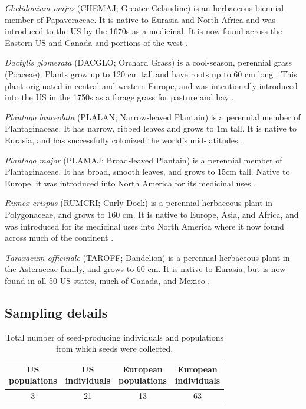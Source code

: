 \documentclass[12pt]{article}\usepackage[]{graphicx}\usepackage[]{color}
\begin{document}
	\textit{Chelidonium majus} (CHEMAJ; Greater Celandine) is an herbaceous biennial member of Papaveraceae. It is native to Eurasia and North Africa and was introduced to the US by the 1670s as a medicinal. It is now found across the Eastern US and Canada and portions of the west \parencite{Holm1979}. 
	
	\textit{Dactylis glomerata} (DACGLO; Orchard Grass) is a cool-season, perennial grass (Poaceae). Plants grow up to 120 cm tall and have roots up to 60 cm long \parencite{Moser1996}. This plant originated in central and western Europe, and was intentionally introduced into the US in the 1750s \parencite{Bush2012} as a forage grass for pasture and hay \parencite{Ogle2011}.  
	
	\textit{Plantago lanceolata} (PLALAN; Narrow-leaved Plantain) is a perennial member of  Plantaginaceae. It has narrow, ribbed leaves and grows to 1m tall. It is native to Eurasia, and has successfully colonized the world's mid-latitudes \parencite{Holm1977}.
	
	\textit{Plantago major} (PLAMAJ; Broad-leaved Plantain) is a perennial member of Plantaginaceae. It has broad, smooth leaves, and grows to 15cm tall. Native to Europe, it was introduced into North America for its medicinal uses \parencite{Knobloch1996,Samuelsen2000}.
	
	\textit{Rumex crispus} (RUMCRI; Curly Dock) is a perennial herbaceous plant in Polygonaceae, and grows to 160 cm. It is native to Europe, Asia, and Africa, and was introduced for its medicinal uses into North America where it now found across much of the continent \parencite{USDA2010}. 
	
	\textit{Taraxacum officinale} (TAROFF; Dandelion) is a perennial herbaceous plant in the Asteraceae family, and grows to 60 cm. It is native to Eurasia, but is now found in all 50 US states, much of Canada, and Mexico \parencite{USDA1971}.

\subsection{Sampling details}

	\begin{center}
		\begin{table}[H]
			\centering
			\caption {Total number of seed-producing individuals and populations from which seeds were collected.} \label{tab:seeds}  
			\begin{tabular}{c|c|c|c}
				\makecell{\textbf{US} \\ \textbf{populations}} & \makecell{\textbf{US} \\  \textbf{individuals}} & \makecell{\textbf{European} \\ \textbf{populations}} & \makecell{\textbf{European} \\ \textbf{individuals}} \\
				\hline
				3&	21&	13&	63\\
			\end{tabular}
		\end{table}
	\end{center}
\end{document}
